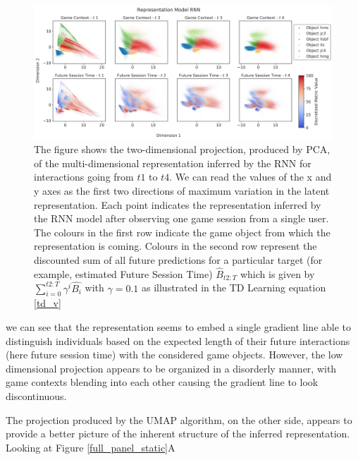 \begin{figure}[ht]
\centering
\includegraphics[width=\textwidth]{images/chapter_4/rnn_future_sess_pca.png}
\caption[\textbf{Lower dimensional representation of the latent state generated by the RNN architecture using PCA}]{The figure shows the two-dimensional projection, produced by PCA, of the multi-dimensional representation inferred by the RNN for interactions going from $t1$ to $t4$. We can read the values of the x and y axes as the first two directions of maximum variation in the latent representation. Each point indicates the representation inferred by the RNN model after observing one game session from a single user. The colours in the first row indicate the game object from which the representation is coming. Colours in the second row represent the discounted sum of all future predictions for a particular target (for example, estimated Future Session Time) $\widehat{B}_{t2:T}$ which is given by $\sum_{i=0}^{t2:T} \gamma^i\widehat{B_i}$ with $\gamma=0.1$ as illustrated in the TD Learning equation \ref{td_v}}
\label{temporal_panel_rnn_pca}
\end{figure}

we can see that the representation seems to embed a single gradient line able to distinguish individuals based on the expected length of their future interactions (here future session time) with the considered game objects. However, the low dimensional projection appears to be organized in a disorderly manner, with game contexts blending into each other causing the gradient line to look discontinuous. 

The projection produced by the UMAP algorithm, on the other side, appears to provide a better picture of the inherent structure of the inferred representation. Looking at Figure \ref{full_panel_static}A 

